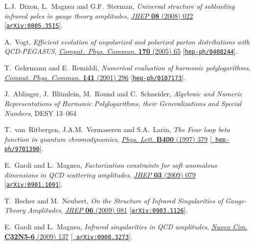 \documentclass[12pt]{article}
\begin{document}
{\begin{thebibliography}{100}
L.J.~Dixon, L.~Magnea and G.F.~Sterman, \emph{{Universal structure of
  subleading infrared poles in gauge theory amplitudes}},
  \href{https://dx.doi.org/10.1088/1126-6708/2008/08/022}{\emph{JHEP} {\bf 08}
  (2008) 022} [\href{https://arxiv.org/abs/0805.3515}{{\tt arXiv:0805.3515}}].

A.~Vogt, \emph{{Efficient evolution of unpolarized and polarized parton
  distributions with QCD-PEGASUS}},
  \href{https://dx.doi.org/10.1016/j.cpc.2005.03.103}{\emph{Comput.~Phys.
  Commun.} {\bf 170} (2005) 65}
  [\href{https://arxiv.org/abs/hep-ph/0408244}{{\tt hep-ph/0408244}}].

T.~Gehrmann and E.~Remiddi, \emph{{Numerical evaluation of harmonic
  polylogarithms}},
  \href{https://dx.doi.org/10.1016/S0010-4655(01)00411-8}{\emph{Comput. Phys.
  Commun.} {\bf 141} (2001) 296}
  [\href{https://arxiv.org/abs/hep-ph/0107173}{{\tt hep-ph/0107173}}].

J.~Ablinger, J.~Bl{\"u}mlein, M.~Round and C.~Schneider, 
  {\it Algebraic and Numeric Representations of Harmonic Polylogarithms, 
  their Generalizations and Special Numbers}, DESY 13--064

T.~van~Ritbergen, J.A.M.~Vermaseren and S.A.~Larin, \emph{{The Four loop beta
  function in quantum chromodynamics}},
  \href{https://dx.doi.org/10.1016/S0370-2693(97)00370-5}{\emph{Phys. Lett.}
  {\bf B400} (1997) 379} [\href{https://arxiv.org/abs/hep-ph/9701390}{{\tt
  hep-ph/9701390}}].

E.~Gardi and L.~Magnea, \emph{{Factorization constraints for soft anomalous
  dimensions in QCD scattering amplitudes}},
  \href{https://dx.doi.org/10.1088/1126-6708/2009/03/079}{\emph{JHEP} {\bf 03}
  (2009) 079} [\href{https://arxiv.org/abs/0901.1091}{{\tt arXiv:0901.1091}}].

T.~Becher and M.~Neubert, \emph{{On the Structure of Infrared Singularities of
  Gauge-Theory Amplitudes}},
  \href{https://dx.doi.org/10.1088/1126-6708/2009/06/081,
  10.1007/JHEP11(2013)024}{\emph{JHEP} {\bf 06} (2009) 081}
  [\href{https://arxiv.org/abs/0903.1126}{{\tt arXiv:0903.1126}}].

E.~Gardi and L.~Magnea, \emph{{Infrared singularities in QCD amplitudes}},
  \href{https://dx.doi.org/10.1393/ncc/i2010-10528-x}{\emph{Nuovo Cim.} {\bf
  C32N5-6} (2009) 137} [\href{https://arxiv.org/abs/0908.3273}{{\tt
  arXiv:0908.3273}}].


\end{thebibliography}}
\end{document}
